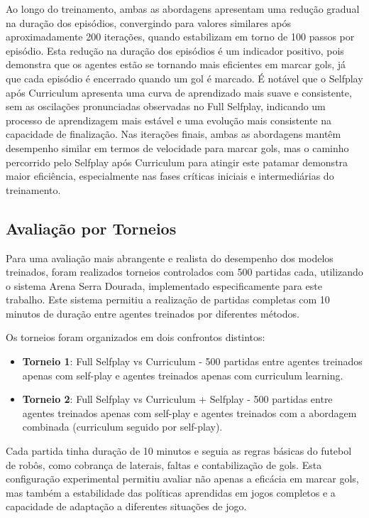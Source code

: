 Ao longo do treinamento, ambas as abordagens apresentam uma redução gradual na duração dos episódios, convergindo para valores similares após aproximadamente 200 iterações, quando estabilizam em torno de 100 passos por episódio. Esta redução na duração dos episódios é um indicador positivo, pois demonstra que os agentes estão se tornando mais eficientes em marcar gols, já que cada episódio é encerrado quando um gol é marcado. É notável que o Selfplay após Curriculum apresenta uma curva de aprendizado mais suave e consistente, sem as oscilações pronunciadas observadas no Full Selfplay, indicando um processo de aprendizagem mais estável e uma evolução mais consistente na capacidade de finalização. Nas iterações finais, ambas as abordagens mantêm desempenho similar em termos de velocidade para marcar gols, mas o caminho percorrido pelo Selfplay após Curriculum para atingir este patamar demonstra maior eficiência, especialmente nas fases críticas iniciais e intermediárias do treinamento.

\subsection{Avaliação por Torneios}

Para uma avaliação mais abrangente e realista do desempenho dos modelos treinados, foram realizados torneios controlados com 500 partidas cada, utilizando o sistema Arena Serra Dourada, implementado especificamente para este trabalho. Este sistema permitiu a realização de partidas completas com 10 minutos de duração entre agentes treinados por diferentes métodos.

Os torneios foram organizados em dois confrontos distintos:
\begin{itemize}
    \item \textbf{Torneio 1}: Full Selfplay vs Curriculum - 500 partidas entre agentes treinados apenas com self-play e agentes treinados apenas com curriculum learning.
    \item \textbf{Torneio 2}: Full Selfplay vs Curriculum + Selfplay - 500 partidas entre agentes treinados apenas com self-play e agentes treinados com a abordagem combinada (curriculum seguido por self-play).
\end{itemize}

Cada partida tinha duração de 10 minutos e seguia as regras básicas do futebol de robôs, como cobrança de laterais, faltas e contabilização de gols. Esta configuração experimental permitiu avaliar não apenas a eficácia em marcar gols, mas também a estabilidade das políticas aprendidas em jogos completos e a capacidade de adaptação a diferentes situações de jogo.

